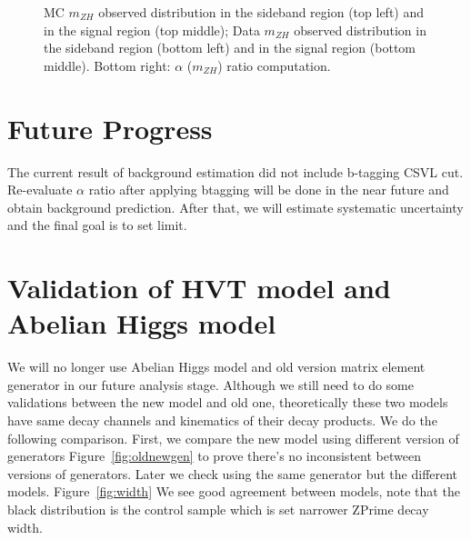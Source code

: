 \documentclass[12pt]{article} %
\begin{document}
\begin{figure}[H] %
  \caption{MC $m_{ZH}$ observed distribution in the sideband region (top left) and in the signal region (top middle); Data $m_{ZH}$ observed distribution in the sideband region (bottom left) and in the signal region (bottom middle). Bottom right: $\alpha$ ($m_{ZH}$) ratio computation.}
  \label{fig:alpha}
\end{figure}





\section{Future Progress} %

The current result of background estimation did not include b-tagging CSVL cut. Re-evaluate $\alpha$ ratio after applying btagging will be done in the near future and obtain background prediction. After that, we will estimate systematic uncertainty and the final goal is to set limit.




\newpage


\section{Validation of HVT model and Abelian Higgs model}

We will no longer use Abelian Higgs model and old version matrix element generator in our future analysis stage. Although we still need to do some validations between the new model and old one, theoretically these two models have same decay channels and kinematics of their decay products. We do the following comparison. First, we compare the new model using different version of generators Figure~\ref{fig:oldnewgen} to prove there's no inconsistent between versions of generators. Later we check using the same generator but the different models. Figure~\ref{fig:width} We see good agreement between models, note that the black distribution is the control sample which is set narrower ZPrime decay width.
\end{document}

